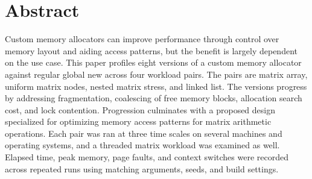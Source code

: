 \section*{Abstract}

Custom memory allocators can improve performance through control over memory
layout and aiding access patterns, but the benefit is largely dependent on the use
case. This paper profiles eight versions of a custom memory allocator against
regular global new across four workload pairs. The pairs are matrix array,
uniform matrix nodes, nested matrix stress, and linked list. The versions progress by
addressing fragmentation, coalescing of free memory blocks, allocation search
cost, and lock contention. Progression culminates with a proposed design
specialized for optimizing memory access patterns for matrix arithmetic operations.
Each pair was ran at three time scales on several machines and
operating systems, and a threaded matrix workload was examined as well.
Elapsed time, peak memory, page faults, and context switches were
recorded across repeated runs using matching arguments, seeds, and build
settings.
